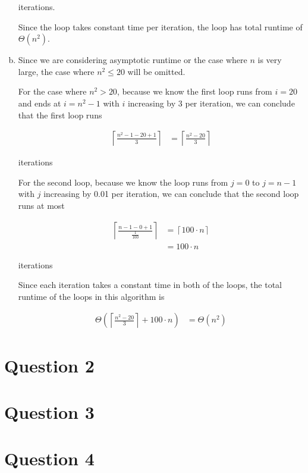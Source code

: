 \documentclass[12pt]{article}
\begin{document}
\begin{enumerate}[a.]
    iterations.

    \bigskip

    Since the loop takes constant time per iteration, the loop has total runtime
    of $\Theta(n^2)$.

    \item

    Since we are considering asymptotic runtime or the case where $n$ is very large,
    the case where $n^2 \leq 20$ will be omitted.

    \bigskip

    For the case where $n^2 > 20$, because we know the first loop runs from $i = 20$
    and ends at $i = n^2 - 1$ with $i$ increasing by 3 per iteration, we can conclude
    that the first loop runs

    \setcounter{equation}{0}
    \begin{align}
        \left\lceil \frac{n^2 -1 - 20 + 1}{3} \right\rceil &= \left\lceil \frac{n^2 - 20}{3} \right\rceil
    \end{align}

    iterations

    \bigskip

    For the second loop, because we know the loop runs from $j = 0$ to $j = n-1$
    with $j$ increasing by 0.01 per iteration, we can conclude that the second loop
    runs at most

    \begin{align}
        \left\lceil \frac{n - 1 - 0 + 1}{\frac{1}{100}} \right\rceil &= \left\lceil 100 \cdot n \right\rceil\\
        &= 100 \cdot n
    \end{align}

    iterations

    \bigskip

    Since each iteration takes a constant time in both of the loops, the total
    runtime of the loops in this algorithm is

    \begin{align}
        \Theta \left( \left\lceil \frac{n^2 - 20}{3} \right\rceil + 100 \cdot n \right) &= \Theta(n^2)
    \end{align}

\end{enumerate}

\section*{Question 2}

\section*{Question 3}

\section*{Question 4}
\end{document}
